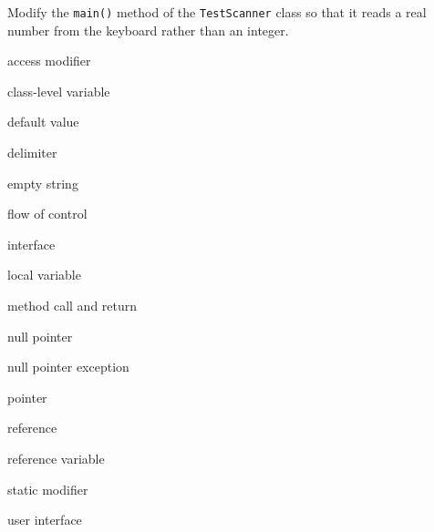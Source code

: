 \begin{SSTUDY}

\item Modify the {\tt main()} method of the {\tt TestScanner} class
  so that it reads a real number from the keyboard rather than an integer.
  
\end{SSTUDY}




\begin{KT}

access modifier

class-level variable

default value

delimiter

empty string

flow of control

interface

local variable

method call and return

null pointer

null pointer exception

pointer 

reference

reference variable

static modifier

user interface
\end{KT}

